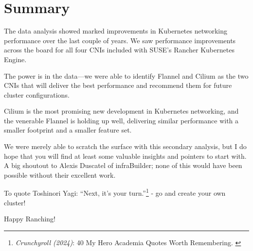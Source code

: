 %
%

\pagebreak
\section{Summary}

\onehalfspacing

The data analysis showed marked improvements in Kubernetes networking performance over the last couple of years. We saw performance improvements across the board for all four CNIs included with SUSE's Rancher Kubernetes Engine.

The power is in the data—we were able to identify Flannel and Cilium as the two CNIs that will deliver the best performance and recommend them for future cluster configurations.

Cilium is the most promising new development in Kubernetes networking, and the venerable Flannel is holding up well, delivering similar performance with a smaller footprint and a smaller feature set.

We were merely able to scratch the surface with this secondary analysis, but I do hope that you will find at least some valuable insights and pointers to start with. A big shoutout to Alexis Duscatel of infraBuilder; none of this would have been possible without their excellent work.

To quote Toshinori Yagi: “Next, it’s your turn.”\footnote{\textit{Crunchyroll (2024)}: 40 My Hero Academia Quotes Worth Remembering. \cite{mhaQuotes}} - go and create your own cluster!

Happy Ranching!

